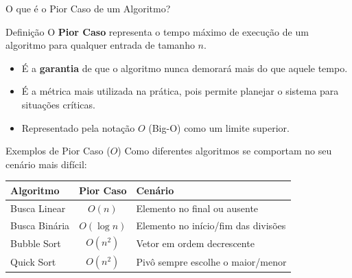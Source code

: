 \documentclass[9pt]{beamer}
\begin{document}
\begin{frame}{O que é o Pior Caso de um Algoritmo?}
    \begin{block}{Definição}
        O \textbf{Pior Caso} representa o tempo máximo de execução de um algoritmo para qualquer entrada de tamanho $n$.
    \end{block}
    \vspace{0.4cm}
    \begin{itemize}
        \item É a \textbf{garantia} de que o algoritmo nunca demorará mais do que aquele tempo.
        \item É a métrica mais utilizada na prática, pois permite planejar o sistema para situações críticas.
        \item Representado pela notação $O$ (Big-O) como um limite superior.
    \end{itemize}
\end{frame}

\begin{frame}{Exemplos de Pior Caso ($O$)}
    Como diferentes algoritmos se comportam no seu cenário mais difícil:
    \vspace{0.3cm}
    \begin{table}
        \centering
        \begin{tabular}{l|c|l}
            \hline
            \textbf{Algoritmo} & \textbf{Pior Caso} & \textbf{Cenário} \\
            \hline
            Busca Linear & $O(n)$ & Elemento no final ou ausente \\
            Busca Binária & $O(\log n)$ & Elemento no início/fim das divisões \\
            Bubble Sort & $O(n^2)$ & Vetor em ordem decrescente \\
            Quick Sort & $O(n^2)$ & Pivô sempre escolhe o maior/menor \\
            \hline
        \end{tabular}
    \end{table}
\end{frame}
\end{document}

